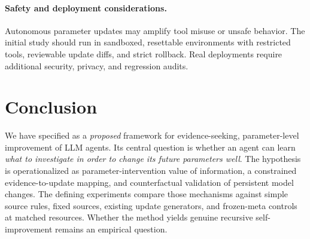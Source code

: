 \paragraph{Safety and deployment considerations.}
Autonomous parameter updates may amplify tool misuse or
unsafe behavior. The initial study should run in sandboxed,
resettable environments with restricted tools, reviewable update
diffs, and strict rollback. Real deployments require additional
security, privacy, and regression audits.

\section{Conclusion}
\label{sec:conclusion}
We have specified \spear{} as a \emph{proposed} framework for
evidence-seeking, parameter-level improvement of LLM agents.
Its central question is whether an agent can learn \emph{what
to investigate in order to change its future parameters well}.
The hypothesis is operationalized as parameter-intervention
value of information, a constrained evidence-to-update mapping,
and counterfactual validation of persistent model changes.
The defining experiments compare those mechanisms against
simple source rules, fixed sources, existing update generators,
and frozen-meta controls at matched resources.
Whether the method yields genuine recursive self-improvement
remains an empirical question.
